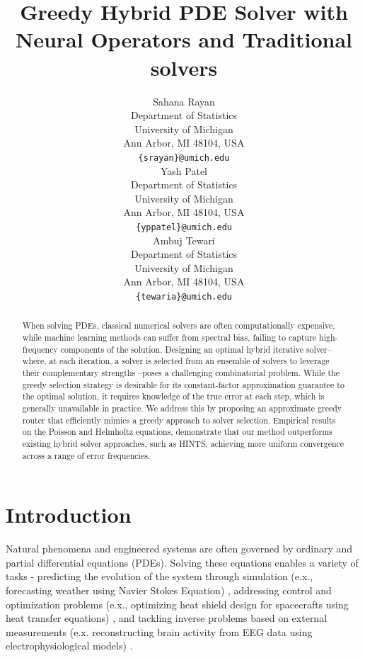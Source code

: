 \documentclass{article} %
\title{Greedy Hybrid PDE Solver with \\ Neural Operators and Traditional solvers}
\author{Sahana Rayan \\
Department of Statistics\\
University of Michigan\\
Ann Arbor, MI 48104, USA \\
\texttt{\{srayan\}@umich.edu} \\
\And
Yash Patel \\
Department of Statistics\\
University of Michigan\\
Ann Arbor, MI 48104, USA \\
\texttt{\{yppatel\}@umich.edu} \\
\And
Ambuj Tewari \\
Department of Statistics\\
University of Michigan\\
Ann Arbor, MI 48104, USA \\
\texttt{\{tewaria\}@umich.edu} \\
}
\begin{document}
\maketitle

\begin{abstract}

When solving PDEs, classical numerical solvers are often computationally expensive, while machine learning methods can suffer from spectral bias, failing to capture high-frequency components of the solution. Designing an optimal hybrid iterative solver--where, at each iteration, a solver is selected from an ensemble of solvers to leverage their complementary strengths --poses a challenging combinatorial problem. While the greedy selection strategy is desirable for its constant-factor approximation guarantee to the optimal solution, it requires knowledge of the true error at each step, which is generally unavailable in practice. We address this by proposing an approximate greedy router that efficiently mimics a greedy approach to solver selection. Empirical results on the Poisson and Helmholtz equations, demonstrate that our method outperforms existing hybrid solver approaches, such as HINTS, achieving more uniform convergence across a range of error frequencies.

\end{abstract}

\section{Introduction}

Natural phenomena and engineered systems are often governed by ordinary and partial differential equations (PDEs). Solving these equations enables a variety of tasks - predicting the evolution of the system through simulation (e.x., forecasting weather using Navier Stokes Equation) \citep{kalnay2003atmospheric,bauer2015quiet,staniforth1991semi}, addressing control and optimization problems (e.x., optimizing heat shield design for spacecrafts using heat transfer equations) \citep{anderson1989hypersonic,troltzsch2010optimal}, and tackling inverse problems based on external measurements (e.x. reconstructing brain activity from EEG data using electrophysiological models) \citep{baillet2001electromagnetic,grech2008review}. 
\end{document}
